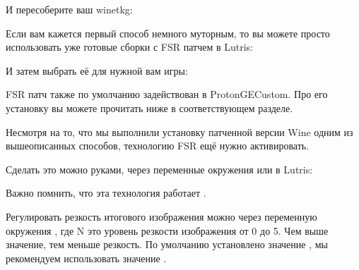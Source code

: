 \documentclass[letterpaper,10pt,russian,openany]{sphinxmanual}
\begin{document}
\sphinxAtStartPar
И пересоберите ваш wine\sphinxhyphen{}tkg: 

\sphinxAtStartPar
{}

\sphinxAtStartPar
Если вам кажется первый способ немного муторным, то вы можете просто использовать уже готовые сборки с FSR патчем в Lutris:

\noindent{}

\sphinxAtStartPar
И затем выбрать её для нужной вам игры:

\noindent{}

\sphinxAtStartPar
{}

\sphinxAtStartPar
FSR патч также по умолчанию задействован в Proton\sphinxhyphen{}GE\sphinxhyphen{}Custom.
Про его установку вы можете прочитать ниже в соответствующем разделе.

\sphinxAtStartPar
{}

\sphinxAtStartPar
Несмотря на то, что мы выполнили установку патченной версии Wine одним из вышеописанных способов,
технологию FSR ещё нужно активировать.

\sphinxAtStartPar
Сделать это можно руками, через переменные окружения  или в Lutris:

\noindent{}

\sphinxAtStartPar
Важно помнить, что эта технология работает .

\sphinxAtStartPar
Регулировать резкость итогового изображения можно через переменную окружения ,
где N \sphinxhyphen{} это уровень резкости изображения от 0 до 5. Чем выше значение, тем меньше резкость.
По умолчанию установлено значение , мы рекомендуем использовать значение .

\sphinxAtStartPar
{}

\sphinxAtStartPar
{}

\ignorespaces 
\end{document}
